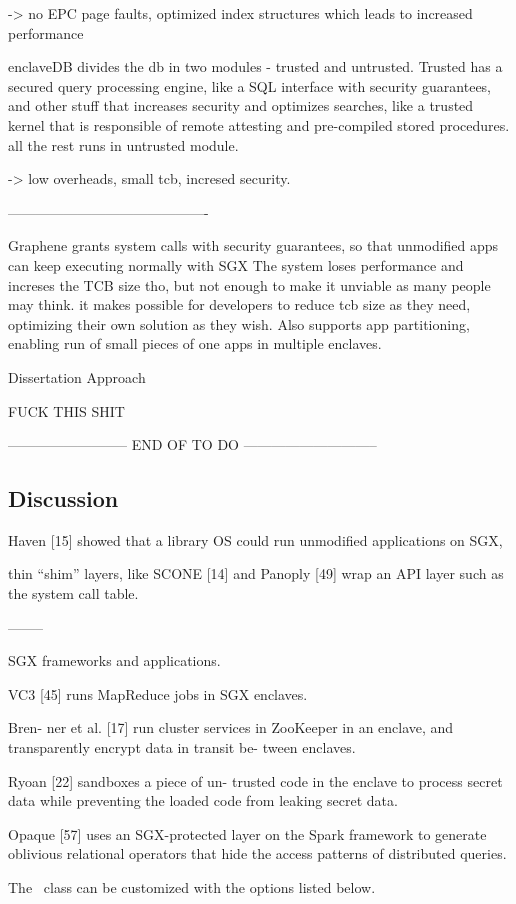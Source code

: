 -> no EPC page faults, optimized index structures which leads to increased performance

enclaveDB divides the db in two modules - trusted and untrusted. Trusted has a secured query processing engine, like a SQL interface with security guarantees, and other stuff that increases security and optimizes searches, like a trusted kernel that is responsible of remote attesting and pre-compiled stored procedures. all the rest runs in untrusted module.

-> low overheads, small tcb, incresed security.


-------------------------------------------

Graphene grants system calls with security guarantees, so that unmodified apps can keep executing normally with SGX
The system loses performance and increses the TCB size tho, but not enough to make it unviable as many people may think. it makes possible for developers to reduce tcb size as they need, optimizing their own solution as they wish. 
Also supports app partitioning, enabling run of small pieces of one apps in multiple enclaves.

Dissertation Approach

FUCK THIS SHIT

-------------------------- END OF TO DO -----------------------------




\subsection{Discussion}
\label{ssec:sgx_frameworks_discussion}

Haven [15] showed
that a library OS could run unmodified applications on
SGX,

thin “shim” layers, like SCONE [14] and Panoply [49] wrap 
an API layer such as the system call table.


--------


SGX frameworks and applications.

VC3 [45]
runs MapReduce jobs in SGX enclaves.

Bren-
ner et al. [17] run cluster services in ZooKeeper in an
enclave, and transparently encrypt data in transit be-
tween enclaves.

Ryoan [22] sandboxes a piece of un-
trusted code in the enclave to process secret data while
preventing the loaded code from leaking secret data.

Opaque [57] uses an SGX-protected layer on the Spark
framework to generate oblivious relational operators that
hide the access patterns of distributed queries.

The \novathesis\ class can be customized with the options listed below.




